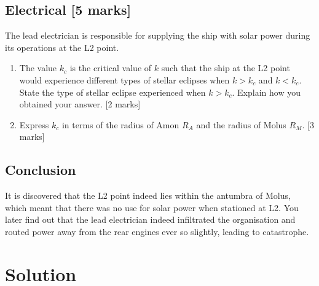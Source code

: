 \documentclass{article}
\begin{document}
\subsection{Electrical [5 marks]}
The lead electrician is responsible for supplying the ship with solar power during its operations at the L2 point.
\begin{enumerate}
\item The value $k_c$ is the critical value of $k$ such that the ship at the L2 point would experience different types of stellar eclipses when $k>k_c$ and $k<k_c$. State the type of stellar eclipse experienced when $k>k_c$. Explain how you obtained your answer. [2 marks]
\item Express $k_c$ in terms of the radius of Amon $R_A$ and the radius of Molus $R_M$. [3 marks] 
\end{enumerate}

\subsection{Conclusion}
It is discovered that the L2 point indeed lies within the antumbra of Molus, which meant that there was no use for solar power when stationed at L2. You later find out that the lead electrician indeed infiltrated the organisation and routed power away from the rear engines ever so slightly, leading to catastrophe.

\section{Solution}
\end{document}
